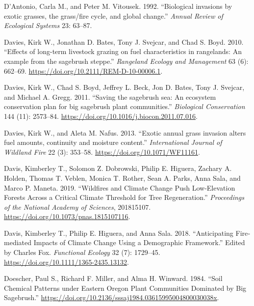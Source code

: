 \documentclass[
  12pt,
]{article}
\newlength{\cslhangindent}
\newlength{\cslentryspacingunit} %
\newenvironment{CSLReferences}[2] %
 {%
  \setlength{\parindent}{0pt}
  \ifodd #1
  \let\oldpar\par
  \def\par{\hangindent=\cslhangindent\oldpar}
  \fi
  \setlength{\parskip}{#2\cslentryspacingunit}
 }%
 {}
\begin{document}
\begin{CSLReferences}{1}{0}
\leavevmode{}%
D'Antonio, Carla M., and Peter M. Vitousek. 1992. {``{Biological
invasions by exotic grasses, the grass/fire cycle, and global
change}.''} \emph{Annual Review of Ecological Systems} 23: 63--87.

\leavevmode{}%
Davies, Kirk W., Jonathan D. Bates, Tony J. Svejcar, and Chad S. Boyd.
2010. {``{Effects of long-term livestock grazing on fuel characteristics
in rangelands: An example from the sagebrush steppe}.''} \emph{Rangeland
Ecology and Management} 63 (6): 662--69.
\url{https://doi.org/10.2111/REM-D-10-00006.1}.

\leavevmode{}%
Davies, Kirk W., Chad S. Boyd, Jeffrey L. Beck, Jon D. Bates, Tony J.
Svejcar, and Michael A. Gregg. 2011. {``{Saving the sagebrush sea: An
ecosystem conservation plan for big sagebrush plant communities}.''}
\emph{Biological Conservation} 144 (11): 2573--84.
\url{https://doi.org/10.1016/j.biocon.2011.07.016}.

\leavevmode{}%
Davies, Kirk W., and Aleta M. Nafus. 2013. {``{Exotic annual grass
invasion alters fuel amounts, continuity and moisture content}.''}
\emph{International Journal of Wildland Fire} 22 (3): 353--58.
\url{https://doi.org/10.1071/WF11161}.

\leavevmode{}%
Davis, Kimberley T., Solomon Z. Dobrowski, Philip E. Higuera, Zachary A.
Holden, Thomas T. Veblen, Monica T. Rother, Sean A. Parks, Anna Sala,
and Marco P. Maneta. 2019. {``Wildfires and Climate Change Push
Low-Elevation Forests Across a Critical Climate Threshold for Tree
Regeneration.''} \emph{Proceedings of the National Academy of Sciences},
201815107. \url{https://doi.org/10.1073/pnas.1815107116}.

\leavevmode{}%
Davis, Kimberley T., Philip E. Higuera, and Anna Sala. 2018.
{``Anticipating Fire‐mediated Impacts of Climate Change Using a
Demographic Framework.''} Edited by Charles Fox. \emph{Functional
Ecology} 32 (7): 1729--45.
\url{https://doi.org/10.1111/1365-2435.13132}.

\leavevmode{}%
Doescher, Paul S., Richard F. Miller, and Alma H. Winward. 1984.
{``{Soil Chemical Patterns under Eastern Oregon Plant Communities
Dominated by Big Sagebrush}.''}
\url{https://doi.org/10.2136/sssaj1984.03615995004800030038x}.


\end{CSLReferences}
\end{document}
